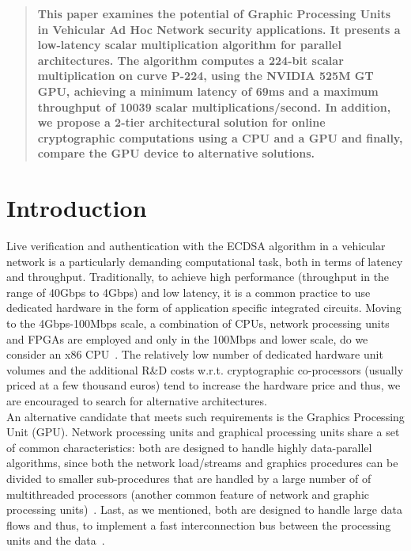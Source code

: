 \documentclass[11pt,twocolumn]{IEEEtran}
\begin{document}
\maketitle

\begin{abstract}
\bf{This paper examines the potential of Graphic Processing Units in Vehicular Ad Hoc Network security applications. It presents a low-latency scalar multiplication algorithm for parallel architectures. The algorithm computes
a 224-bit scalar multiplication on curve P-224, using the NVIDIA 525M GT GPU, achieving a minimum latency of 69ms and a maximum throughput of 10039 scalar multiplications/second. In addition, we propose a 2-tier architectural solution for online cryptographic computations using a CPU and a GPU and finally, compare the GPU device to alternative solutions.}
\end{abstract}

\section{Introduction}\label{intro}
Live verification and authentication with the ECDSA algorithm in a vehicular network  is a particularly demanding computational task, both in terms of latency and throughput.
Traditionally, to achieve high performance (throughput in the range of 40Gbps to 4Gbps) and low latency, it is a common practice to use
dedicated hardware in the form of application specific integrated circuits. Moving to the 4Gbps-100Mbps scale, a combination of
CPUs, network processing units and FPGAs are employed and only in the 100Mbps and lower scale, do we consider an x86 CPU~\cite{gpugems}.
The relatively low number of dedicated hardware unit volumes and the additional R\&D costs w.r.t. cryptographic co-processors (usually priced at a few thousand euros) tend to increase the hardware
price and thus, we are encouraged to search for alternative architectures.\\
An alternative candidate that meets such requirements is the Graphics Processing Unit (GPU). Network processing units
and graphical processing units share a set of common characteristics: both are designed to handle highly data-parallel algorithms, since both the network load/streams
and graphics procedures can be divided to smaller sub-procedures that are handled by a large number of of multithreaded processors (another common feature of network and
graphic processing units)~\cite{gpugems, cudaguide}. Last, as
we mentioned, both are designed to handle large data 
flows and thus, to implement a fast interconnection bus between the processing units and the data~\cite{cudaguide}.
\end{document}
